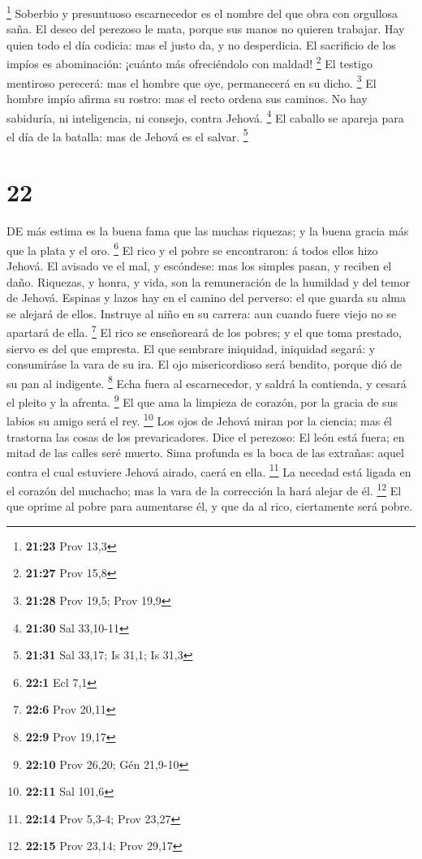 \footnote{\textbf{21:23} Prov 13,3}  Soberbio y presuntuoso
escarnecedor es el nombre del que obra con orgullosa saña. 
El deseo del perezoso le mata, porque sus manos no quieren trabajar.
 Hay quien todo el día codicia: mas el justo da, y no
desperdicia.  El sacrificio de los impíos es abominación:
¡cuánto más ofreciéndolo con maldad! \footnote{\textbf{21:27} Prov 15,8}
 El testigo mentiroso perecerá: mas el hombre que oye,
permanecerá en su dicho. \footnote{\textbf{21:28} Prov 19,5; Prov 19,9}
 El hombre impío afirma su rostro: mas el recto ordena sus
caminos.  No hay sabiduría, ni inteligencia, ni consejo,
contra Jehová. \footnote{\textbf{21:30} Sal 33,10-11}  El
caballo se apareja para el día de la batalla: mas de Jehová es el
salvar. \footnote{\textbf{21:31} Sal 33,17; Is 31,1; Is 31,3}

\hypertarget{section-21}{%
\section{22}\label{section-21}}

 DE más estima es la buena fama que las muchas riquezas; y
la buena gracia más que la plata y el oro. \footnote{\textbf{22:1} Ecl
  7,1}  El rico y el pobre se encontraron: á todos ellos
hizo Jehová.  El avisado ve el mal, y escóndese: mas los
simples pasan, y reciben el daño.  Riquezas, y honra, y
vida, son la remuneración de la humildad y del temor de Jehová.
 Espinas y lazos hay en el camino del perverso: el que
guarda su alma se alejará de ellos.  Instruye al niño en su
carrera: aun cuando fuere viejo no se apartará de ella. \footnote{\textbf{22:6}
  Prov 20,11}  El rico se enseñoreará de los pobres; y el
que toma prestado, siervo es del que empresta.  El que
sembrare iniquidad, iniquidad segará: y consumiráse la vara de su ira.
 El ojo misericordioso será bendito, porque dió de su pan al
indigente. \footnote{\textbf{22:9} Prov 19,17}  Echa fuera
al escarnecedor, y saldrá la contienda, y cesará el pleito y la afrenta.
\footnote{\textbf{22:10} Prov 26,20; Gén 21,9-10}  El que
ama la limpieza de corazón, por la gracia de sus labios su amigo será el
rey. \footnote{\textbf{22:11} Sal 101,6}  Los ojos de
Jehová miran por la ciencia; mas él trastorna las cosas de los
prevaricadores.  Dice el perezoso: El león está fuera; en
mitad de las calles seré muerto.  Sima profunda es la boca
de las extrañas: aquel contra el cual estuviere Jehová airado, caerá en
ella. \footnote{\textbf{22:14} Prov 5,3-4; Prov 23,27}  La
necedad está ligada en el corazón del muchacho; mas la vara de la
corrección la hará alejar de él. \footnote{\textbf{22:15} Prov 23,14;
  Prov 29,17}  El que oprime al pobre para aumentarse él, y
que da al rico, ciertamente será pobre.

